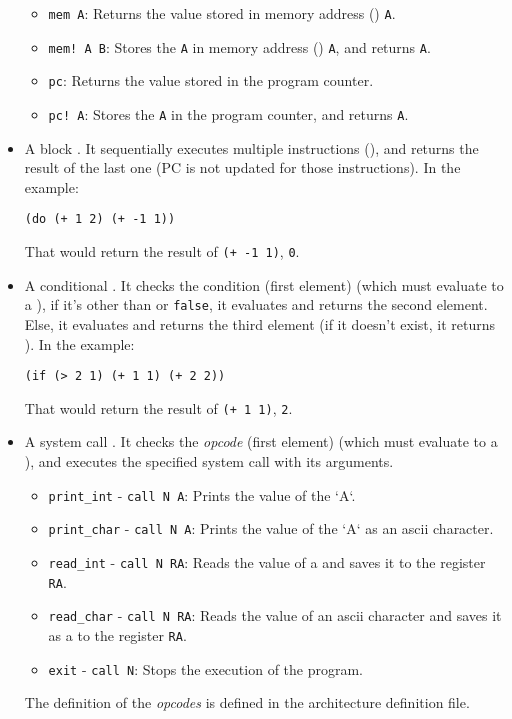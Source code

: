 \begin{itemize}
\begin{itemize}
    \item \texttt{mem A}: Returns the value stored in memory address () \texttt{A}.
    \item \texttt{mem!\ A B}: Stores the  \texttt{A} in memory address () \texttt{A}, and returns \texttt{A}.
    \item \texttt{pc}: Returns the value stored in the program counter.
    \item \texttt{pc!\ A}: Stores the  \texttt{A} in the program counter, and returns \texttt{A}.
  \end{itemize}
  \item A block . It sequentially executes multiple instructions (), and returns the result of the last one (PC is not updated for those instructions). In the example:
  \begin{lstlisting}
(do (+ 1 2) (+ -1 1))
  \end{lstlisting}
  That would return the result of \texttt{(+ -1 1)}, \texttt{0}.
  \item A conditional . It checks the condition (first element) (which must evaluate to a ), if it's other than  or \texttt{false}, it evaluates and returns the second element. Else, it evaluates and returns the third element (if it doesn't exist, it returns ). In the example:
  \begin{lstlisting}
(if (> 2 1) (+ 1 1) (+ 2 2))
  \end{lstlisting}
  That would return the result of \texttt{(+ 1 1)}, \texttt{2}.
  \item A system call . It checks the \textit{opcode} (first element) (which must evaluate to a ), and executes the specified system call with its arguments.
  \begin{itemize}
    \item \texttt{print\_int} - \texttt{call N A}: Prints the value of the  `A`.
    \item \texttt{print\_char} - \texttt{call N A}: Prints the value of the  `A` as an ascii character.
    \item \texttt{read\_int} - \texttt{call N RA}: Reads the value of a  and saves it to the register \texttt{RA}.
    \item \texttt{read\_char} - \texttt{call N RA}: Reads the value of an ascii character and saves it as a  to the register \texttt{RA}.
    \item \texttt{exit} - \texttt{call N}: Stops the execution of the program.
  \end{itemize}
  The definition of the \textit{opcodes} is defined in the architecture definition file.
\end{itemize}

